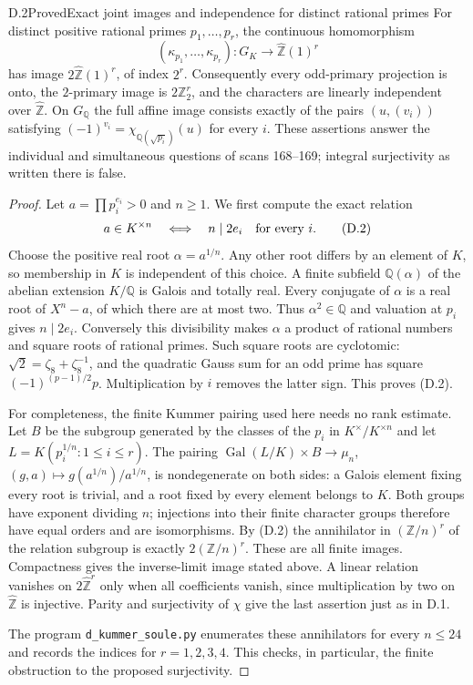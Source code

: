 \begin{statement}{D.2}{Proved}{Exact joint images and independence for distinct rational primes}
For distinct positive rational primes $p_1,\ldots,p_r$, the continuous homomorphism
\[
 (\kappa_{p_1},\ldots,\kappa_{p_r}):G_K\longrightarrow
 \widehat{\mathbb Z}(1)^r
\]
has image $2\widehat{\mathbb Z}(1)^r$, of index $2^r$. Consequently every odd-primary projection is onto, the $2$-primary image is $2\mathbb Z_2^r$, and the characters are linearly independent over $\widehat{\mathbb Z}$. On $G_{\mathbb Q}$ the full affine image consists exactly of the pairs $(u,(v_i))$ satisfying
$(-1)^{v_i}=\chi_{\mathbb Q(\sqrt{p_i})}(u)$ for every $i$.
These assertions answer the individual and simultaneous questions of scans 168--169; integral surjectivity as written there is false.
\end{statement}
\begin{proof}
Let $a=\prod p_i^{e_i}>0$ and $n\geq1$. We first compute the exact relation
\[
 a\in K^{\times n}\quad\Longleftrightarrow\quad n\mid2e_i\quad\hbox{for every }i.       \tag{D.2}
\]
Choose the positive real root $\alpha=a^{1/n}$. Any other root differs by an element of $K$, so membership in $K$ is independent of this choice. A finite subfield $\mathbb Q(\alpha)$ of the abelian extension $K/\mathbb Q$ is Galois and totally real. Every conjugate of $\alpha$ is a real root of $X^n-a$, of which there are at most two. Thus $\alpha^2\in\mathbb Q$ and valuation at $p_i$ gives $n\mid2e_i$. Conversely this divisibility makes $\alpha$ a product of rational numbers and square roots of rational primes. Such square roots are cyclotomic: $\sqrt2=\zeta_8+\zeta_8^{-1}$, and the quadratic Gauss sum for an odd prime has square $(-1)^{(p-1)/2}p$. Multiplication by $i$ removes the latter sign. This proves (D.2).

For completeness, the finite Kummer pairing used here needs no rank estimate. Let $B$ be the subgroup generated by the classes of the $p_i$ in $K^\times/K^{\times n}$ and let $L=K(p_i^{1/n}:1\leq i\leq r)$. The pairing
$\operatorname{Gal}(L/K)\times B\to\mu_n$, $(g,a)\mapsto g(a^{1/n})/a^{1/n}$,
is nondegenerate on both sides: a Galois element fixing every root is trivial, and a root fixed by every element belongs to $K$. Both groups have exponent dividing $n$; injections into their finite character groups therefore have equal orders and are isomorphisms. By (D.2) the annihilator in $(\mathbb Z/n)^r$ of the relation subgroup is exactly $2(\mathbb Z/n)^r$. These are all finite images. Compactness gives the inverse-limit image stated above. A linear relation vanishes on $2\widehat{\mathbb Z}^r$ only when all coefficients vanish, since multiplication by two on $\widehat{\mathbb Z}$ is injective. Parity and surjectivity of $\chi$ give the last assertion just as in D.1.

The program \texttt{d\_kummer\_soule.py} enumerates these annihilators for every $n\leq24$ and records the indices for $r=1,2,3,4$. This checks, in particular, the finite obstruction to the proposed surjectivity.
\end{proof}

